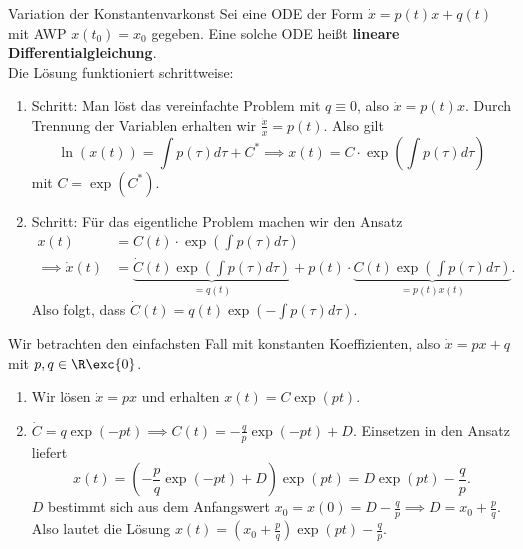 \begin{satz}{Variation der Konstanten}{varkonst}
Sei eine ODE der Form $\dot{x} = p(t)x + q(t)$ mit AWP $x(t_0) = x_0$ gegeben. Eine solche ODE heißt \textbf{lineare Differentialgleichung}.\\
Die Lösung funktioniert schrittweise:
\begin{enumerate}
\item Schritt: Man löst das vereinfachte Problem mit $q \equiv 0$, also $\dot{x}=p(t)x$. Durch Trennung der Variablen erhalten wir $\frac{\dot{x}}{x}=p(t)$. Also gilt
\begin{equation}
\ln (x(t)) = \int p(\tau) d\tau + C^\ast \implies x(t) = C \cdot \exp \left( \int p(\tau) d\tau \right)
\end{equation}
mit $C = \exp(C^\ast)$.
\item Schritt: Für das eigentliche Problem machen wir den Ansatz
\begin{align}
x(t) &= C(t) \cdot \exp \left( \int p(\tau) d \tau \right)\\
\implies \dot{x}(t) &= \underbrace{\dot{C}(t) \exp \left( \int p(\tau) d\tau \right)}_{=q(t)} +p(t) \cdot \underbrace{C(t) \exp \left( \int p(\tau) d\tau \right)}_{=p(t)x(t)}.
\end{align}
Also folgt, dass $\dot{C}(t) = q(t) \exp \left( -\int p(\tau) d\tau \right)$.
\end{enumerate}
\end{satz}
\begin{beispiel}
Wir betrachten den einfachsten Fall mit konstanten Koeffizienten, also $\dot{x}=px+q$ mit $p,q \in \R \exc \{0\}$.
\begin{enumerate}
\item Wir lösen $\dot{x} = px$ und erhalten $x(t) = C \exp(pt)$.
\item $\dot{C}=q\exp(-pt) \implies C(t) = - \frac{q}{p} \exp(-pt) + D$. Einsetzen in den Ansatz liefert
\begin{equation}
x(t) = \left( - \frac{p}{q} \exp(-pt) + D\right)\exp(pt) = D \exp(pt) - \frac{q}{p}.
\end{equation}
$D$ bestimmt sich aus dem Anfangswert $x_0 = x(0) = D-\frac{q}{p} \implies D = x_0 + \frac{p}{q}$. Also lautet die Lösung $x(t) = \left( x_0 + \frac{p}{q}\right) \exp (pt) - \frac{q}{p}.$
\end{enumerate}
\end{beispiel}
